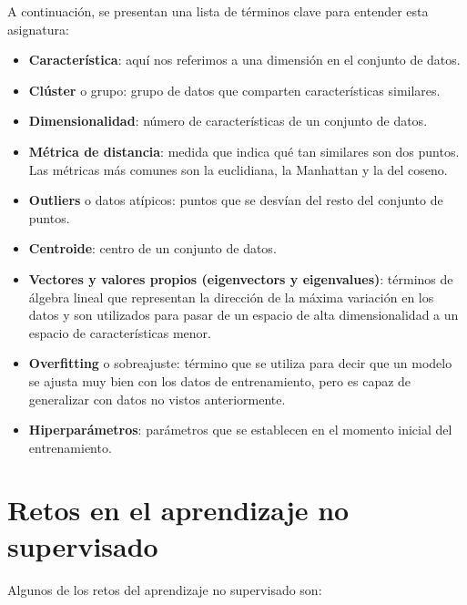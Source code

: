 A continuación, se presentan una lista de términos clave para entender esta asignatura:

\begin{itemize}
    \item \textbf{Característica}: aquí nos referimos a una dimensión en el conjunto de datos. 

    \item \textbf{Clúster} o grupo: grupo de datos que comparten características similares.

    \item \textbf{Dimensionalidad}: número de características de un conjunto de datos.

    \item \textbf{Métrica de distancia}: medida que indica qué tan similares son dos puntos. Las métricas más comunes son la euclidiana, la Manhattan y la del coseno.

    \item \textbf{Outliers} o datos atípicos: puntos que se desvían del resto del conjunto de puntos. 

    \item \textbf{Centroide}: centro de un conjunto de datos.

    \item \textbf{Vectores y valores propios (eigenvectors y eigenvalues)}: términos de álgebra lineal que representan la dirección de la máxima variación en los datos y son utilizados para pasar de un espacio de alta dimensionalidad a un espacio de características menor.

    \item \textbf{Overfitting} o sobreajuste: término que se utiliza para decir que un modelo se ajusta muy bien con los datos de entrenamiento, pero es capaz de generalizar con datos no vistos anteriormente.

    \item \textbf{Hiperparámetros}: parámetros que se establecen en el momento inicial del entrenamiento.
\end{itemize}

\section{Retos en el aprendizaje no supervisado}
Algunos de los retos del aprendizaje no supervisado son:


